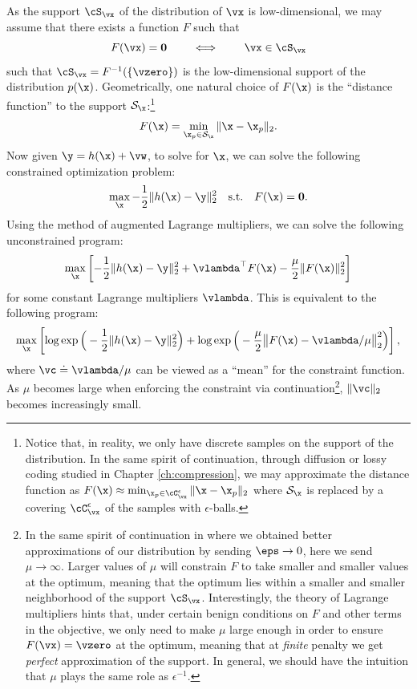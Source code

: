\documentclass[../../book-main.tex]{subfiles}
\begin{document}
As the support \(\cS_{\vx}\) of the distribution of \(\vx\) is low-dimensional, we may assume that there exists a function \(F\) such that
\begin{equation}
  F(\vx) = \boldsymbol{0} \qquad \iff \qquad \vx \in \cS_{\vx}
\end{equation}
such that \(\cS_{\vx} = F^{-1}(\{\vzero\})\) is the low-dimensional support of the distribution $p(\x)$. Geometrically, one natural choice of $F(\x)$ is the ``distance function'' to the support $\mathcal{S}_{\x}$:\footnote{Notice that, in reality, we only have discrete samples on the support of the distribution. In the same spirit of continuation, through diffusion or lossy coding studied in Chapter \ref{ch:compression}, we may approximate the distance function as $F(\x) \approx \min_{\x_p \in \cC_{\vx}^{\epsilon}} \|\x - \x_p\|_2$ where $\mathcal{S}_{\x}$ is replaced by a covering \(\cC_{\vx}^{\epsilon}\) of the samples with $\epsilon$-balls. }
\begin{equation}
    F(\x) = \min_{\x_p \in \mathcal{S}_{\x}} \|\x - \x_p\|_2. 
\end{equation}
Now given $\y = h(\x) +\vw$, to solve for $\x$, we can solve the following constrained optimization problem:
\begin{equation}
    \max_{\x} - \frac{1}{2}\|h(\x) - \y\|_2^2 \quad \mbox{s.t.} \quad F(\x) = \boldsymbol{0}. 
\end{equation}
Using the method of augmented Lagrange multipliers, we can solve the following unconstrained program:
\begin{equation}
   \max_{\x} \left[-\frac{1}{2}\|h(\x) - \y\|_2^2  + \vlambda^{\top} F(\x) - \frac{\mu}{2} \|F(\x)\|_2^2\right]
\end{equation}
for some constant Lagrange multipliers $\vlambda$.
This is equivalent to the following program:
\begin{equation}\label{eq:lagrange_multiplier_continuation}
\max_{\x} \left[\log \exp\Big(- \frac{1}{2}\|h(\x) - \y\|_2^2\Big) + \log \exp\Big( - \frac{\mu}{2} \big\|F(\x) - \vlambda/\mu\big\|_2^2\Big)\right],
\end{equation} 
where $\vc \doteq {\vlambda}/{\mu}$ can be viewed as a ``mean''  for the constraint function. As $\mu$ becomes large when enforcing the constraint via continuation\footnote{In the same spirit of continuation in  where we obtained better approximations of our distribution by sending \(\eps \to 0\), here we send \(\mu \to \infty\). Larger values of \(\mu\) will constrain \(F\) to take smaller and smaller values at the optimum, meaning that the optimum lies within a smaller and smaller neighborhood of the support \(\cS_{\vx}\). Interestingly, the theory of Lagrange multipliers hints that, under certain benign conditions on \(F\) and other terms in the objective, we only need to make \(\mu\) large enough in order to ensure \(F(\vx) = \vzero\) at the optimum, meaning that at \textit{finite} penalty we get \textit{perfect} approximation of the support. In general, we should have the intuition that \(\mu\) plays the same role as  \(\epsilon^{-1}\).}, $\|\vc\|_2$ becomes increasingly small.
\end{document}
